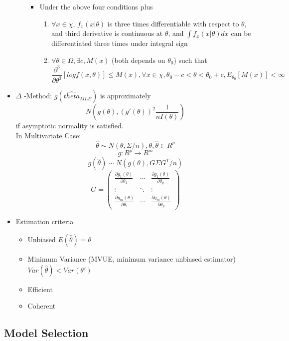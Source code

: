 \documentclass[11pt, openany]{book}              %
\begin{document}
\begin{itemize}
\begin{enumerate}
\begin{itemize}
    		\item Under the above four conditions plus 
    			\begin{enumerate}
    				\item $ \forall x \in \chi$, $f_x(x|\theta)$ is three times differentiable with respect to $\theta$, and third derivative is continuous at $\theta$, and $\int f_x(x|\theta) dx$ can be differentiated three times under integral sign
    				\item $ \forall \theta \in \Omega, \exists c, M(x)$ (both depends on $\theta_0$) such that
    				$$ \frac{\partial^3}{\partial \theta^3} [log f(x, \theta ) ] \leq M(x), \forall x \in \chi, \theta_0-c<\theta < \theta_0+c, E_{\theta_0} [M(x)] < \infty$$
    			\end{enumerate}
    		\end{itemize}
    	\end{enumerate}
    	
    \item $\Delta$ -Method: $g(\hat{theta}_{MLE})$ is approximately
    	  $$ N(g(\theta), (g'(\theta))^2 \frac{1}{nI(\theta)})$$ if asymptotic normality is satisfied. \\
    	  In Multivariate Case:
    	  $$ \hat{\theta} \sim N(\theta, \Sigma/n), \theta,\hat{\theta} \in R^p $$
    	  $$g: R^p \rightarrow R^m$$
    	  $$g(\hat{\theta}) \sim N(g(\theta), G\Sigma G^T/n)$$
		  $$ G = \begin{pmatrix} 
  				\frac{\partial{g_1(\theta)}}{\partial{\theta_1}}& \cdots & \frac{\partial{g_1(\theta)}}{\partial{\theta_p}}\\ 
  				\vdots & \ddots & \vdots \\
  				\frac{\partial{g_m(\theta)}}{\partial{\theta_1}}& \cdots & \frac{\partial{g_m(\theta)}}{\partial{\theta_p}} 
			\end{pmatrix} $$
    \item Estimation criteria
   		\begin{itemize}
   		 \item Unbiased $E(\hat{\theta}) = \theta$
   		 \item Minimum Variance (MVUE, minimum variance unbiased estimator) $Var(\hat{\theta}) < Var(\theta')$
   		 \item Efficient
   		 \item Coherent
   		 \end{itemize}
\end{itemize}

\subsection{Model Selection}
\end{document}
